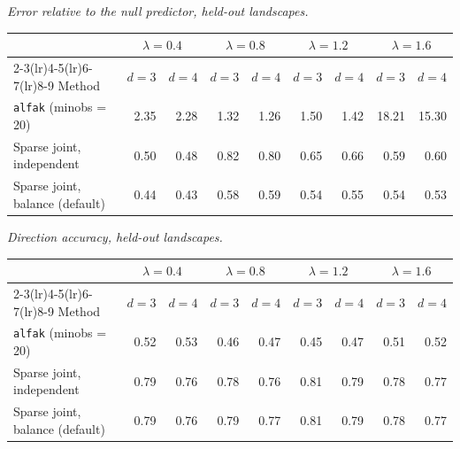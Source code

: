 \par\medskip\noindent\begin{minipage}{\linewidth}
\textit{Error relative to the null predictor, held-out landscapes.}
\begin{center}
\footnotesize
\setlength{\tabcolsep}{3.5pt}
\begin{tabular}{l*{8}{r}}
\toprule
 & \multicolumn{2}{c}{$\lambda=0.4$} & \multicolumn{2}{c}{$\lambda=0.8$} & \multicolumn{2}{c}{$\lambda=1.2$} & \multicolumn{2}{c}{$\lambda=1.6$} \\
\cmidrule(lr){2-3}\cmidrule(lr){4-5}\cmidrule(lr){6-7}\cmidrule(lr){8-9}
Method & $d=3$ & $d=4$ & $d=3$ & $d=4$ & $d=3$ & $d=4$ & $d=3$ & $d=4$ \\
\midrule
\texttt{alfak} (minobs = 20) & 2.35 & 2.28 & 1.32 & 1.26 & 1.50 & 1.42 & 18.21 & 15.30 \\
Sparse joint, independent & 0.50 & 0.48 & 0.82 & 0.80 & 0.65 & 0.66 & 0.59 & 0.60 \\
Sparse joint, balance (default) & 0.44 & 0.43 & 0.58 & 0.59 & 0.54 & 0.55 & 0.54 & 0.53 \\
\bottomrule
\end{tabular}
\end{center}
\end{minipage}

\par\medskip\noindent\begin{minipage}{\linewidth}
\textit{Direction accuracy, held-out landscapes.}
\begin{center}
\footnotesize
\setlength{\tabcolsep}{3.5pt}
\begin{tabular}{l*{8}{r}}
\toprule
 & \multicolumn{2}{c}{$\lambda=0.4$} & \multicolumn{2}{c}{$\lambda=0.8$} & \multicolumn{2}{c}{$\lambda=1.2$} & \multicolumn{2}{c}{$\lambda=1.6$} \\
\cmidrule(lr){2-3}\cmidrule(lr){4-5}\cmidrule(lr){6-7}\cmidrule(lr){8-9}
Method & $d=3$ & $d=4$ & $d=3$ & $d=4$ & $d=3$ & $d=4$ & $d=3$ & $d=4$ \\
\midrule
\texttt{alfak} (minobs = 20) & 0.52 & 0.53 & 0.46 & 0.47 & 0.45 & 0.47 & 0.51 & 0.52 \\
Sparse joint, independent & 0.79 & 0.76 & 0.78 & 0.76 & 0.81 & 0.79 & 0.78 & 0.77 \\
Sparse joint, balance (default) & 0.79 & 0.76 & 0.79 & 0.77 & 0.81 & 0.79 & 0.78 & 0.77 \\
\bottomrule
\end{tabular}
\end{center}
\end{minipage}

